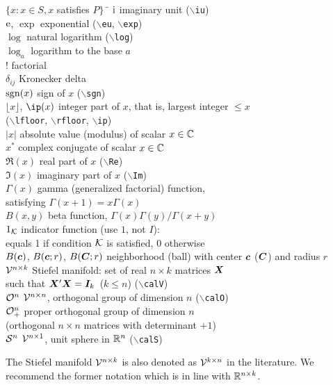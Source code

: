 \documentclass[11pt,dvips,a4paper]{article}
\newcommand{\hspacesymbols}%
   {$\{x: x \in S, x$ satisfies $P\}\;\;$} %
\newcommand{\type}[1]{{\tt$\backslash$#1}}
\begin{document}
\begin{tabbing}
\hspacesymbols \=   \kill
$\mathrm{i}$ \> imaginary unit (\type{iu}) \\
${\mathrm{e}}$, $\exp$ \> exponential (\type{eu}, \type{exp}) \\
$\log$ \> natural logarithm (\type{log})\\
$\log_a$ \> logarithm to the base $a$ \\
$!$ \> factorial \\
$\delta_{ij}$ \> Kronecker delta \\
$\operatorname{sgn}(x)$ \> sign of $x$ (\type{sgn}) \\
$\lfloor x\rfloor$, $\ip(x)$ \> integer part of $x$, that is,
largest integer $\leq x$ \\
\> (\type{lfloor}, \type{rfloor}, \type{ip}) \\
$|x|$ \> absolute value (modulus) of scalar $x\in\mathbb{C}$ \\
$x^*$ \> complex conjugate of scalar $x\in\mathbb{C}$ \\
$\Re(x)$ \> real part of $x$  (\type{Re}) \\
$\Im(x)$ \> imaginary part of $x$  (\type{Im}) \\
$\varGamma(x)$ \> gamma (generalized factorial) function,\\
\> satisfying $\varGamma(x+1)=x\varGamma(x)$ \\
$B(x,y)$ \> beta function, $\varGamma(x)\varGamma(y)/\varGamma(x+y)$ \\
$1_{\mathcal{K}}$ \> indicator function (use $1$, not $I$): \\
\> equals 1 if condition $\mathcal{K}$ is satisfied, 0 otherwise\\
$B(\bm c)$, $B(\bm c;r)$, $B(\bm C;r)$ \> neighborhood (ball) with center $\bm c$ ($\bm C$)
and radius $r$\\
$\mathcal{V}^{n\times k}$ \> Stiefel manifold: set of real $n\times k$
matrices $\bm X$ \\
\>such that $\bm X'\bm X=\bm I_k$\, ($k\le n$) (\type{calV}) \\
$\mathcal{O}^n$ \> $\mathcal{V}^{n\times n}$, orthogonal group of dimension $n$ (\type{calO}) \\
$\mathcal{O}_+^n$ \> proper orthogonal group of dimension $n$ \\
\>(orthogonal $n\times n$ matrices with determinant $+1$) \\
$\mathcal{S}^n$ \> $\mathcal{V}^{n\times 1}$, unit sphere in $\mathbb{R}^n$ (\type{calS})
\end{tabbing}
The Stiefel manifold $\mathcal{V}^{n\times k}$ is also denoted
as $\mathcal{V}^{k\times n}$ in the literature. We recommend the former
notation which is in line with $\mathbb{R}^{n\times k}$.
%
\end{document}
